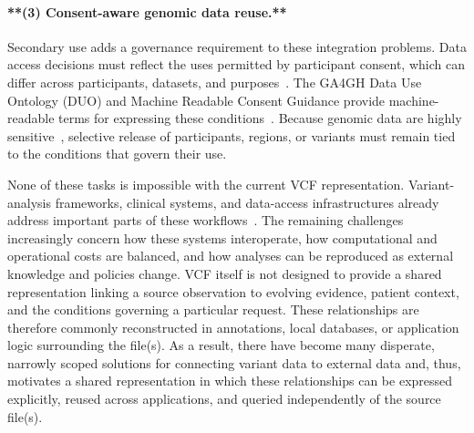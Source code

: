 \documentclass[pdflatex,sn-mathphys-num]{sn-jnl}
\begin{document}
\paragraph{**(3) Consent-aware genomic data reuse.**}\label{uc:reuse}
Secondary use adds a governance requirement to these integration problems.
Data access decisions must reflect the uses permitted by participant consent, which can differ across participants, datasets, and purposes~\cite{lawson2021duo,rehm2021ga4gh}.
The GA4GH Data Use Ontology (DUO) and Machine Readable Consent Guidance provide machine-readable terms for expressing these conditions~\cite{lawson2021duo,ga4gh_mrcg,rehm2021ga4gh}.
Because genomic data are highly sensitive~\cite{gdpr2016,shabani2018gdpr}, selective release of participants, regions, or variants must remain tied to the conditions that govern their use.

None of these tasks is impossible with the current VCF representation.
Variant-analysis frameworks, clinical systems, and data-access infrastructures already address important parts of these workflows~\cite{paila2013gemini,wake2022pgx,rehm2021ga4gh}.
The remaining challenges increasingly concern how these systems interoperate, how computational and operational costs are balanced, and how analyses can be reproduced as external knowledge and policies change.
VCF itself is not designed to provide a shared representation linking a source observation to evolving evidence, patient context, and the conditions governing a particular request.
These relationships are therefore commonly reconstructed in annotations, local databases, or application logic surrounding the file(s).
As a result, there have become many disperate, narrowly scoped solutions for connecting variant data to external data and, thus, motivates a shared representation in which these relationships can be expressed explicitly, reused across applications, and queried independently of the source file(s).
\end{document}
